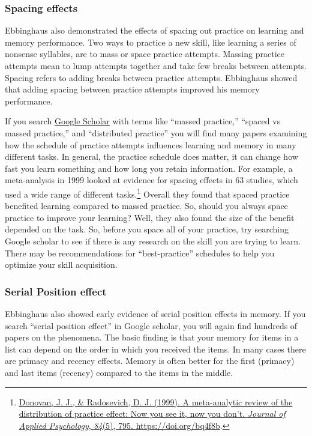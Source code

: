 \documentclass[
  oneside,
  12pt]{crumpbook}
\begin{document}
\hypertarget{spacing-effects}{%
\subsubsection{Spacing effects}\label{spacing-effects}}

Ebbinghaus also demonstrated the effects of spacing out practice on learning and memory performance. Two ways to practice a new skill, like learning a series of nonsense syllables, are to mass or space practice attempts. Massing practice attempts mean to lump attempts together and take few breaks between attempts. Spacing refers to adding breaks between practice attempts. Ebbinghaus showed that adding spacing between practice attempts improved his memory performance.

If you search \href{https://scholar.google.com/}{Google Scholar} with terms like ``massed practice,'' ``spaced vs massed practice,'' and ``distributed practice'' you will find many papers examining how the schedule of practice attempts influences learning and memory in many different tasks. In general, the practice schedule does matter, it can change how fast you learn something and how long you retain information. For example, a meta-analysis in 1999 looked at evidence for spacing effects in 63 studies, which used a wide range of different tasks.\footnote{\protect\hyperlink{ref-donovanMetaanalyticReviewDistribution1999}{Donovan, J. J., \& Radosevich, D. J. (1999). A meta-analytic review of the distribution of practice effect: {Now} you see it, now you don't. \emph{Journal of Applied Psychology}, \emph{84}(5), 795. \url{https://doi.org/bq4f8b}}.} Overall they found that spaced practice benefited learning compared to massed practice. So, should you always space practice to improve your learning? Well, they also found the size of the benefit depended on the task. So, before you space all of your practice, try searching Google scholar to see if there is any research on the skill you are trying to learn. There may be recommendations for ``best-practice'' schedules to help you optimize your skill acquisition.

\hypertarget{serial-position-effect}{%
\subsubsection{Serial Position effect}\label{serial-position-effect}}

Ebbinghaus also showed early evidence of serial position effects in memory. If you search ``serial position effect'' in Google scholar, you will again find hundreds of papers on the phenomena. The basic finding is that your memory for items in a list can depend on the order in which you received the items. In many cases there are primacy and recency effects. Memory is often better for the first (primacy) and last items (recency) compared to the items in the middle.
\end{document}
